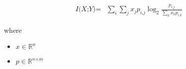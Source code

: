 \documentclass[12pt]{article}
\begin{document}
\begin{align*}
\textit{I(X;Y)} = & \sum_\textit{i} \sum_\textit{j} \textit{x}_{ \textit{j} }\textit{p}_{\textit{i}, \textit{j}} \log_2{ \frac{\textit{p}_{\textit{i}, \textit{j}}}{\sum_\textit{k} \textit{x}_{ \textit{k} }\textit{p}_{\textit{i}, \textit{k}}} }
\end{align*}

where
\begin{itemize}
\item $\textit{x} \in \mathbb{R}^{ \textit{n}}$
\item $\textit{p} \in \mathbb{R}^{ \textit{n} \times \textit{m} }$
\end{itemize}
\end{document}
